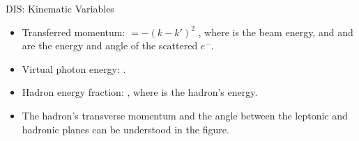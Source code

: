 \begin{frame}{DIS: Kinematic Variables}
    \label{10.12::dis}

    \begin{itemize}
        \item
            Transferred momentum:  $= -(k - k')^2$ , where  is the beam energy, and  and  are the energy and angle of the scattered $e^-$.

        \item
            Virtual photon energy: .

        \item
            Hadron energy fraction: , where  is the hadron's energy.

        \item
            The hadron's transverse momentum  and the angle between the leptonic and hadronic planes  can be understood in the figure.
    \end{itemize}

    \begin{center}
        \begin{figure}[t]
        \end{figure}
    \end{center}
\end{frame}

